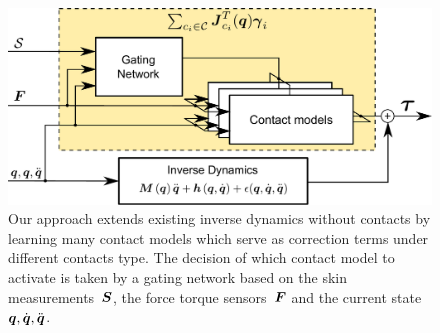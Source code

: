 	\begin{figure}[t]
		\centering
		\includegraphics[width =.58\linewidth]{robertoIROS/fig/diagram_2.pdf}
		\caption{Our approach extends existing inverse dynamics without contacts by learning many contact models which serve as correction terms under different contacts type. The decision of which contact model to activate is taken by a gating network based on the skin measurements~$\mathcal{\boldsymbol{S}}$, the force torque sensors~$\boldsymbol{F}$ and the current state $\boldsymbol q, \dot{\boldsymbol q}, \ddot{\boldsymbol q}$.}
		\label{fig:model}
	\end{figure}



